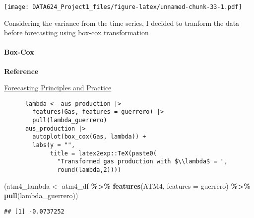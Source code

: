 \documentclass[
]{article}
\newenvironment{Shaded}{\begin{snugshade}}{\end{snugshade}}
\newcommand{\AttributeTok}[1]{\textcolor[rgb]{0.13,0.29,0.53}{#1}}
\newcommand{\CommentTok}[1]{\textcolor[rgb]{0.56,0.35,0.01}{\textit{#1}}}
\newcommand{\FunctionTok}[1]{\textcolor[rgb]{0.13,0.29,0.53}{\textbf{#1}}}
\newcommand{\NormalTok}[1]{#1}
\newcommand{\OtherTok}[1]{\textcolor[rgb]{0.56,0.35,0.01}{#1}}
\newcommand{\SpecialCharTok}[1]{\textcolor[rgb]{0.81,0.36,0.00}{\textbf{#1}}}
\begin{document}
\texttt{[image: DATA624\_Project1\_files/figure-latex/unnamed-chunk-33-1.pdf]}

Considering the variance from the time series, I decided to tranform the
data before forecasting using box-cox transformation

\hypertarget{box-cox}{%
\paragraph{Box-Cox}\label{box-cox}}

\textbf{Reference}

\href{https://otexts.com/fpp3/transformations.html}{Forecasting
Principles and Practice}

\begin{verbatim}
      lambda <- aus_production |>
        features(Gas, features = guerrero) |>
        pull(lambda_guerrero)
      aus_production |>
        autoplot(box_cox(Gas, lambda)) +
        labs(y = "",
             title = latex2exp::TeX(paste0(
               "Transformed gas production with $\\lambda$ = ",
               round(lambda,2))))
\end{verbatim}

\begin{Shaded}
\begin{Highlighting}[]
\NormalTok{(atm4\_lambda }\OtherTok{\textless{}{-}}\NormalTok{ atm4\_df }\SpecialCharTok{\%\textgreater{}\%}
  \FunctionTok{features}\NormalTok{(ATM4, }\AttributeTok{features =}\NormalTok{ guerrero) }\SpecialCharTok{\%\textgreater{}\%}
  \FunctionTok{pull}\NormalTok{(lambda\_guerrero))}
\end{Highlighting}
\end{Shaded}

\begin{verbatim}
## [1] -0.0737252
\end{verbatim}

\begin{Shaded}
\end{Shaded}
\end{document}
